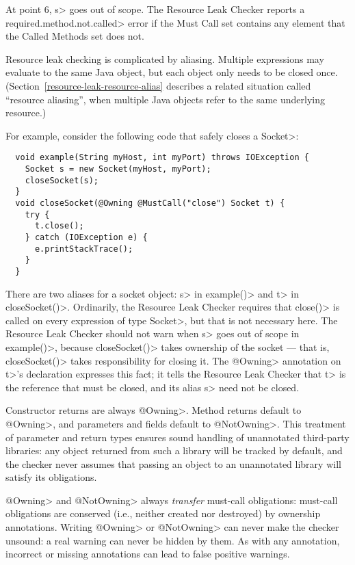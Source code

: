 At point 6, \<s> goes out of scope.  The Resource Leak Checker reports a
\<required.method.not.called> error if the Must Call set contains any
element that the Called Methods set does not.



Resource leak checking is complicated by aliasing.  Multiple expressions
may evaluate to the same Java object, but each object only needs to be
closed once.  (Section~\ref{resource-leak-resource-alias} describes a
related situation called ``resource aliasing'', when multiple Java objects
refer to the same underlying resource.)

For example, consider the following code that safely closes a \<Socket>:

\begin{verbatim}
  void example(String myHost, int myPort) throws IOException {
    Socket s = new Socket(myHost, myPort);
    closeSocket(s);
  }
  void closeSocket(@Owning @MustCall("close") Socket t) {
    try {
      t.close();
    } catch (IOException e) {
      e.printStackTrace();
    }
  }
\end{verbatim}

There are two aliases for a socket object: \<s> in \<example()> and \<t> in
\<closeSocket()>.  Ordinarily, the Resource Leak Checker requires that
\<close()> is called on every expression of type \<Socket>, but that is not
necessary here.  The Resource Leak Checker should not warn when
\<s> goes out of scope in \<example()>, because \<closeSocket()> takes ownership
of the socket --- that is, \<closeSocket()> takes responsibility for closing
it. The \<@Owning> annotation on \<t>'s declaration expresses this fact; it
tells the Resource Leak Checker that \<t> is the reference that must be
closed, and its alias \<s> need not be closed.

Constructor returns are always \<@Owning>.
Method returns default to \<@Owning>,
and parameters and fields default to \<@NotOwning>. This treatment of parameter and
return types ensures sound handling of unannotated third-party libraries: any
object returned from such a library will be tracked by default, and the checker
never assumes that passing an object to an unannotated library will satisfy its obligations.

\<@Owning> and \<@NotOwning> always \emph{transfer} must-call obligations: must-call
obligations are conserved (i.e., neither created nor destroyed) by ownership annotations.
Writing \<@Owning> or \<@NotOwning> can never make the checker
unsound:  a real warning can never be hidden by them.
As with any annotation, incorrect or missing annotations can lead to false positive warnings.


